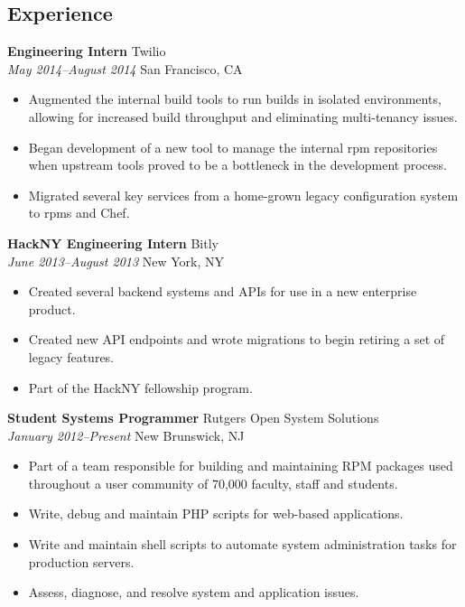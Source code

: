 \documentclass[centered,overlapped]{res}
\begin{document}

\address{153 Riveredge Road \\ Tinton Falls, NJ 07724}
\address{josh@jmatthews.us \\ github.com/jmatth}

\begin{resume}

\section{Experience}

{\bf Engineering Intern} \hfill Twilio\\
\textit{May 2014--August 2014} \hfill San Francisco, CA
\begin{itemize} \itemsep -2pt %
    \item Augmented the internal build tools to run builds in isolated
      environments, allowing for increased build throughput and eliminating
      multi-tenancy issues.
    \item Began development of a new tool to manage the internal rpm
      repositories when upstream tools proved to be a bottleneck in the
      development process.
    \item Migrated several key services from a home-grown legacy configuration
        system to rpms and Chef.
\end{itemize}

{\bf HackNY Engineering Intern} \hfill Bitly\\
\textit{June 2013--August 2013} \hfill New York, NY
\begin{itemize} \itemsep -2pt %
	\item Created several backend systems and APIs for use in a new enterprise
        product.
    \item Created new API endpoints and wrote migrations to begin retiring a set
        of legacy features.
    \item Part of the HackNY fellowship program.
\end{itemize}

{\bf Student Systems Programmer} \hfill Rutgers Open System Solutions\\
\textit{January 2012--Present} \hfill New Brunswick, NJ
\begin{itemize} \itemsep -2pt %
	\item Part of a team responsible for building and maintaining RPM packages used throughout a user community of 70,000 faculty, staff and students.
	\item Write, debug and maintain PHP scripts for web-based applications.
	\item Write and maintain shell scripts to automate system administration tasks for production servers.
	\item Assess, diagnose, and resolve system and application issues.
\end{itemize}



\end{resume}
\end{document}
